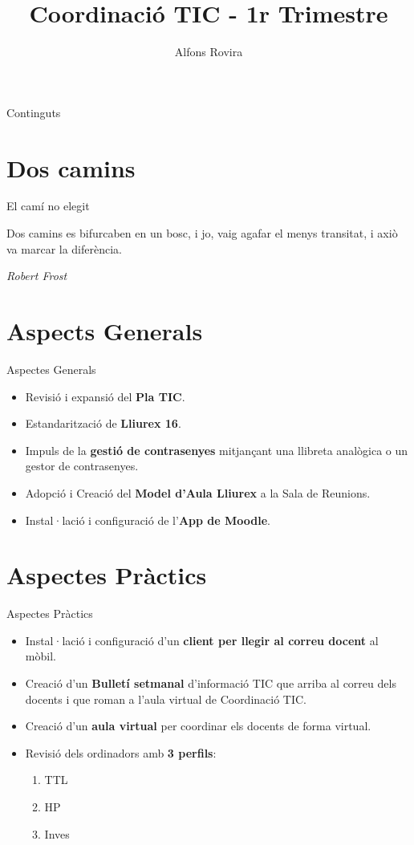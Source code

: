 \documentclass[xcolor=dvipsnames]{beamer}
\title{Coordinació TIC - 1r Trimestre}
\author{Alfons Rovira}
\begin{document}
\frame[plain]{\titlepage}

\begin{frame}[plain]{Continguts}
	\tableofcontents
\end{frame}

\section{Dos camins}
\begin{frame}{El camí no elegit}

  \epigraph{Dos camins es bifurcaben en un bosc, i jo, vaig agafar el menys transitat, i axiò va marcar la diferència.}
{\textit{Robert Frost}}
\end{frame}

\section{Aspects Generals}
\begin{frame}{Aspectes Generals}
  
\begin{itemize}
\item<1->
  Revisió i expansió del \textbf{Pla TIC}.
\item<2->
  Estandarització de \textbf{Lliurex 16}.
\item<3->
  Impuls de la \textbf{gestió de contrasenyes} mitjançant una llibreta analògica
  o un gestor de contrasenyes.
\item<4->
  Adopció i Creació del \textbf{Model d'Aula Lliurex} a la Sala de Reunions.
\item<5->
  Instal·lació i configuració de l'\textbf{App de Moodle}.
\end{itemize}
\end{frame}

\section{Aspectes Pràctics}
\begin{frame}{Aspectes Pràctics}

\begin{itemize}
\item<1->
  Instal·lació i configuració d'un \textbf{client per llegir al correu docent} al
  mòbil.
\item<2->
  Creació d'un \textbf{Bulletí setmanal} d'informació TIC que arriba al correu
  dels docents i que roman a l'aula virtual de Coordinació TIC.
\item<3->
  Creació d'un \textbf{aula virtual} per coordinar els docents de forma virtual.
\item<4->
  Revisió dels ordinadors amb \textbf{3 perfils}:

  \begin{enumerate}
  \item<5->
    TTL
  \item<6->
    HP
  \item<7->
    Inves
  \end{enumerate}
\end{itemize}
\end{frame}
\end{document}
